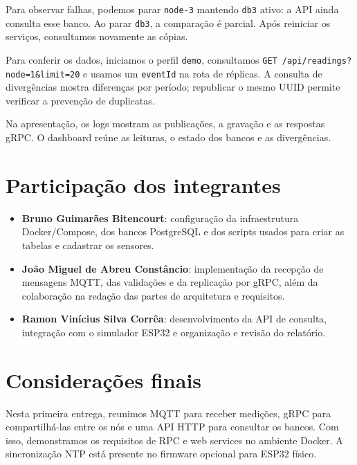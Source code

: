 \documentclass[12pt]{article}
\begin{document}
Para observar falhas, podemos parar \texttt{node-3} mantendo \texttt{db3}
ativo: a API ainda consulta esse banco. Ao parar \texttt{db3}, a comparação
é parcial. Após reiniciar os serviços, consultamos novamente as cópias.

Para conferir os dados, iniciamos o perfil \texttt{demo}, consultamos
\texttt{GET /api/readings?node=1\&limit=20} e usamos um \texttt{eventId}
na rota de réplicas. A consulta de divergências mostra diferenças por período;
republicar o mesmo UUID permite verificar a prevenção de duplicatas.

Na apresentação, os logs mostram as publicações, a gravação e as respostas
gRPC. O dashboard reúne as leituras, o estado dos bancos e as divergências.

\section{Participação dos integrantes}

\begin{itemize}
\item \textbf{Bruno Guimarães Bitencourt}: configuração da infraestrutura
Docker/Compose, dos bancos PostgreSQL e dos scripts usados para criar as
tabelas e cadastrar os sensores.
\item \textbf{João Miguel de Abreu Constâncio}: implementação da recepção de
mensagens MQTT, das validações e da replicação por gRPC, além da colaboração
na redação das partes de arquitetura e requisitos.
\item \textbf{Ramon Vinícius Silva Corrêa}: desenvolvimento da API de
consulta, integração com o simulador ESP32 e organização e revisão do
relatório.
\end{itemize}

\section{Considerações finais}

Nesta primeira entrega, reunimos MQTT para receber medições, gRPC para
compartilhá-las entre os nós e uma API HTTP para consultar os bancos. Com
isso, demonstramos os requisitos de RPC e web services no ambiente Docker.
A sincronização NTP está presente no firmware opcional para ESP32 físico.
\end{document}
